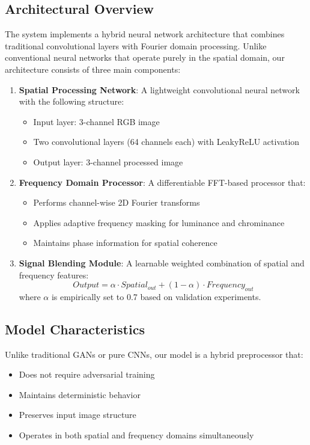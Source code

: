 \documentclass{article}
\begin{document}
\subsection{Architectural Overview}
The system implements a hybrid neural network architecture that combines traditional convolutional layers with Fourier domain processing. Unlike conventional neural networks that operate purely in the spatial domain, our architecture consists of three main components:

\begin{enumerate}
    \item \textbf{Spatial Processing Network}: A lightweight convolutional neural network with the following structure:
    \begin{itemize}
        \item Input layer: 3-channel RGB image
        \item Two convolutional layers (64 channels each) with LeakyReLU activation
        \item Output layer: 3-channel processed image
    \end{itemize}
    
    \item \textbf{Frequency Domain Processor}: A differentiable FFT-based processor that:
    \begin{itemize}
        \item Performs channel-wise 2D Fourier transforms
        \item Applies adaptive frequency masking for luminance and chrominance
        \item Maintains phase information for spatial coherence
    \end{itemize}
    
    \item \textbf{Signal Blending Module}: A learnable weighted combination of spatial and frequency features:
    \begin{equation}
        Output = \alpha \cdot Spatial_{out} + (1-\alpha) \cdot Frequency_{out}
    \end{equation}
    where $\alpha$ is empirically set to 0.7 based on validation experiments.
\end{enumerate}

\subsection{Model Characteristics}
Unlike traditional GANs or pure CNNs, our model is a hybrid preprocessor that:
\begin{itemize}
    \item Does not require adversarial training
    \item Maintains deterministic behavior
    \item Preserves input image structure
    \item Operates in both spatial and frequency domains simultaneously
\end{itemize}
\end{document}
